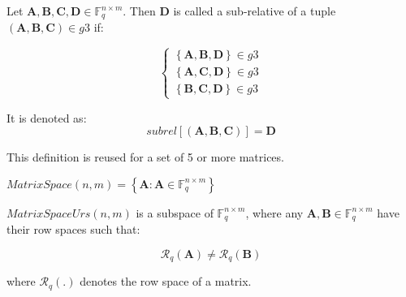 %
\begin{defn}
 Let $\boldsymbol{A},\boldsymbol{B},\boldsymbol{C},\boldsymbol{D}\in\ensuremath{\mathbb{F}}_{q}^{n\times m}$.
Then $\boldsymbol{D}$ is called a sub-relative of a tuple $\left(\boldsymbol{A},\boldsymbol{B},\boldsymbol{C}\right)\in g3$
if:

\[
\left\{ \begin{array}{c}
\left\{ \boldsymbol{A},\boldsymbol{B},\boldsymbol{D}\right\} \in g3\\
\left\{ \boldsymbol{A},\boldsymbol{C},\boldsymbol{D}\right\} \in g3\\
\left\{ \boldsymbol{B},\boldsymbol{C},\boldsymbol{D}\right\} \in g3
\end{array}\right.
\]

It is denoted as: 
\[
subrel\left[\left(\boldsymbol{A},\boldsymbol{B},\boldsymbol{C}\right)\right]=\boldsymbol{D}
\]

This definition is reused for a set of 5 or more matrices.
\end{defn}
%
\begin{defn}[MatrixSpace]
 $MatrixSpace(n,m)=\left\{ \boldsymbol{A}:\boldsymbol{A}\in\ensuremath{\mathbb{F}}_{q}^{n\times m}\right\} $
\end{defn}
%
\begin{defn}
 $MatrixSpaceUrs(n,m)$ is a subspace of $\ensuremath{\mathbb{F}}_{q}^{n\times m}$,
where any $\boldsymbol{A},\boldsymbol{B}\in\ensuremath{\mathbb{F}}_{q}^{n\times m}$
have their row spaces such that:

\[
\mathcal{R}_{q}\left(\boldsymbol{A}\right)\neq\mathcal{R}_{q}\left(\boldsymbol{B}\right)
\]

where $\mathcal{R}_{q}\left(.\right)$ denotes the row space of a
matrix.
\end{defn}
